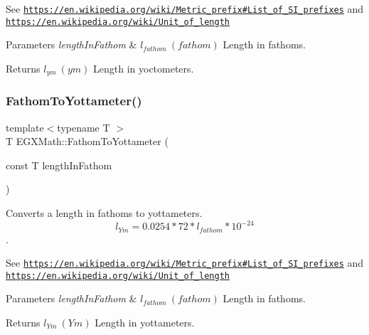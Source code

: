 See \href{https://en.wikipedia.org/wiki/Metric_prefix#List_of_SI_prefixes}{\tt https\+://en.\+wikipedia.\+org/wiki/\+Metric\+\_\+prefix\#\+List\+\_\+of\+\_\+\+S\+I\+\_\+prefixes} and \href{https://en.wikipedia.org/wiki/Unit_of_length}{\tt https\+://en.\+wikipedia.\+org/wiki/\+Unit\+\_\+of\+\_\+length} 
\begin{DoxyParams}{Parameters}
{\em length\+In\+Fathom} & $ l_{fathom}\ (fathom)$ Length in fathoms. \\
\hline
\end{DoxyParams}
\begin{DoxyReturn}{Returns}
$ l_{ym}\ (ym)$ Length in yoctometers. 
\end{DoxyReturn}
\mbox{\label{group___e_g_x_math-_conversions-_length_conversions-_imperial-_fathom-_s_i_ga0f5e5e4cd705f904b759f069f8926aa3}} 
\subsubsection{\texorpdfstring{Fathom\+To\+Yottameter()}{FathomToYottameter()}}
{\footnotesize\ttfamily template$<$typename T $>$ \\
T E\+G\+X\+Math\+::\+Fathom\+To\+Yottameter (\begin{DoxyParamCaption}\item[{const T}]{length\+In\+Fathom }\end{DoxyParamCaption})}



Converts a length in fathoms to yottameters. \[ l_{Ym}=0.0254 * 72 * l_{fathom} * 10^{-24} \]. 

See \href{https://en.wikipedia.org/wiki/Metric_prefix#List_of_SI_prefixes}{\tt https\+://en.\+wikipedia.\+org/wiki/\+Metric\+\_\+prefix\#\+List\+\_\+of\+\_\+\+S\+I\+\_\+prefixes} and \href{https://en.wikipedia.org/wiki/Unit_of_length}{\tt https\+://en.\+wikipedia.\+org/wiki/\+Unit\+\_\+of\+\_\+length} 
\begin{DoxyParams}{Parameters}
{\em length\+In\+Fathom} & $ l_{fathom}\ (fathom)$ Length in fathoms. \\
\hline
\end{DoxyParams}
\begin{DoxyReturn}{Returns}
$ l_{Ym}\ (Ym)$ Length in yottameters. 
\end{DoxyReturn}
\mbox{\label{group___e_g_x_math-_conversions-_length_conversions-_imperial-_fathom-_s_i_ga2ce11498768b6c37b65bce7b6915d153}} 
